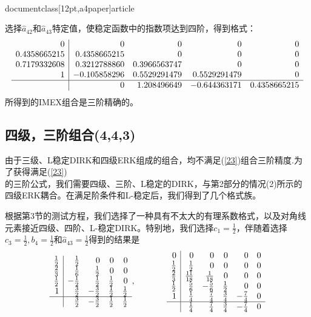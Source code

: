 \\documentclass[12pt,a4paper]{article}
\begin{document}
选择$\widehat{a}_{42}$和$\widehat{a}_{43}$特定值，使稳定函数中的指数项达到四阶，得到格式：
\[
\begin{array}{r|rrrr}
0 & 0 & 0 & 0 & 0 \\
0.4358665215 & 0.4358665215 & 0 &  0 & 0\\
0.7179332608 & 0.3212788860 & 0.3966563747 & 0 & 0\\
1 & -0.105858296 & 0.5529291479 & 0.5529291479 & 0\\
\hline
& 0 & 1.208496649 & -0.644363171 & 0.4358665215
\end{array}
\]
所得到的IMEX组合是三阶精确的。

\subsection{四级，三阶组合(4,4,3)}

由于三级、L稳定DIRK和四级ERK组成的组合，均不满足(\ref{23})组合三阶精度.为了获得满足(\ref{23})\\的三阶公式，我们需要四级、三阶、L稳定的DIRK，与第2部分的情况(2)所示的四级ERK耦合。在满足阶条件和L-稳定后，我们得到了几个格式族。

根据第3节的测试方程，我们选择了一种具有不太大的有理系数格式，以及对角线元素接近四级、四阶、L-稳定DIRK。特别地，我们选择$c_{1}=\frac{1}{2}$，伴随着选择$c_{3}=\frac{1}{2},b_{4}=\frac{1}{2}$和$\widehat{a}_{43}=\frac{1}{2}$得到的结果是
\[
\begin{array}{r|rrrr}
\frac{1}{2} & \frac{1}{2} & 0 & 0 & 0\\
\frac{2}{3} & \frac{1}{6} & \frac{1}{2} & 0 & 0 \\
\frac{1}{2} & -\frac{1}{2} & \frac{1}{2} & \frac{1}{2} & 0 \\
1 & \frac{3}{2} & -\frac{3}{2} & \frac{1}{2} & \frac{1}{2} \\
\hline
& \frac{3}{2} & -\frac{3}{2} & \frac{1}{2} & \frac{1}{2} 
\end{array},~~~~~~~~~~~
\begin{array}{r|rrrrr}
0 & 0 & 0 & 0 & 0 & 0 \\
\frac{1}{2} & \frac{1}{2} & 0 & 0 & 0 & 0\\
\frac{2}{3} & \frac{11}{18} & \frac{1}{18} & 0 & 0 & 0\\
\frac{1}{2} & \frac{5}{6} & -\frac{5}{6} & \frac{1}{2} & 0 & 0\\
1 & \frac{1}{4} & \frac{7}{4} & \frac{3}{4} & -\frac{7}{4} & 0\\
\hline
& \frac{1}{4} & \frac{7}{4} & \frac{3}{4} & -\frac{7}{4} & 0
\end{array}
\]
\end{document}
